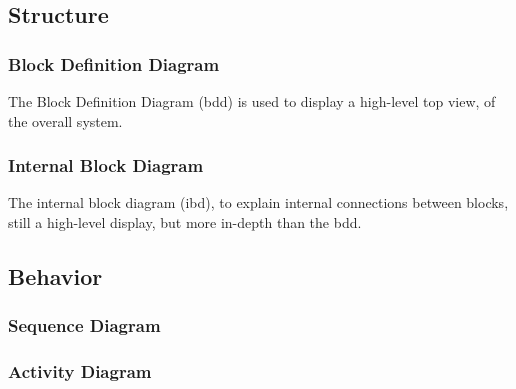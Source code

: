 \blindtext %




\subsection{Structure}

\blindtext %

\subsubsection{Block Definition Diagram}
The Block Definition Diagram (bdd) is used to display a high-level top view, of the overall system.


\subsubsection{Internal Block Diagram}
The internal block diagram (ibd), to explain internal connections between blocks, still a high-level display, but more in-depth than the bdd.




\subsection{Behavior}

\blindtext %

\subsubsection{Sequence Diagram}

\blindtext %

\subsubsection{Activity Diagram}

\blindtext %
